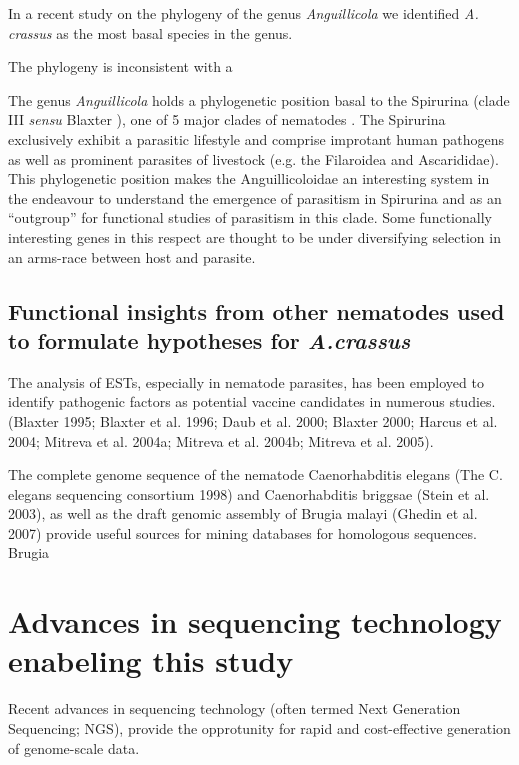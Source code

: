  In a recent study on the phylogeny of the genus
  \textit{Anguillicola} we identified \textit{A. crassus} as the most
  basal species in the genus.

  The phylogeny  is inconsistent
  with a


  The genus \textit{Anguillicola} holds a phylogenetic position basal
  to the Spirurina (clade III \textit{sensu} Blaxter
  \cite{blaxter_molecular_1998}), one of 5 major clades of nematodes
  \cite{nadler_molecular_2007, wijov_evolutionary_2006}. The Spirurina
  exclusively exhibit a parasitic lifestyle and comprise improtant
  human pathogens as well as prominent parasites of livestock
  (e.g. the Filaroidea and Ascarididae). This phylogenetic position
  makes the Anguillicoloidae an interesting system in the endeavour to
  understand the emergence of parasitism in Spirurina and as an
  ``outgroup'' for functional studies of parasitism in this
  clade. Some functionally interesting genes in this respect are
  thought to be under diversifying selection in an arms-race between
  host and parasite\cite{zang_serine_2001}.



\subsection{Functional insights from other nematodes used to formulate
  hypotheses for \textit{A.crassus}}

The analysis of ESTs, especially in nematode parasites, has been
employed to identify pathogenic factors as potential vaccine
candidates in numerous studies. (Blaxter 1995; Blaxter et al. 1996;
Daub et al. 2000; Blaxter 2000; Harcus et al. 2004; Mitreva et
al. 2004a; Mitreva et al. 2004b; Mitreva et al. 2005).


The complete genome sequence of the nematode Caenorhabditis elegans
(The C. elegans sequencing consortium 1998) and Caenorhabditis
briggsae (Stein et al. 2003), as well as the draft genomic assembly of
Brugia malayi (Ghedin et al. 2007) provide useful sources for mining
databases for homologous sequences. Brugia


\section{Advances in sequencing technology enabeling this study}


Recent advances in sequencing technology (often termed Next Generation
Sequencing; NGS), provide the opprotunity for rapid and cost-effective
generation of genome-scale data.

